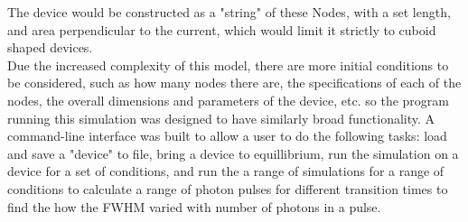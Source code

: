 \documentclass[titlepage]{article}
\begin{document}
The device would be constructed as a "string" of these Nodes, with a set length, and area perpendicular to the current, which would limit it strictly to cuboid shaped devices. \\
Due the increased complexity of this model, there are more initial conditions to be considered, such as how many nodes there are, the specifications of each of the nodes, the overall dimensions and parameters of the device, etc. so the program running this simulation was designed to have similarly broad functionality. A command-line interface was built to allow a user to do the following tasks: load and save a "device" to file, bring a device to equillibrium, run the simulation on a device for a set of conditions, and run the a range of simulations for a range of conditions to calculate a range of photon pulses for different transition times to find the how the FWHM varied with number of photons in a pulse. \\
\end{document}
